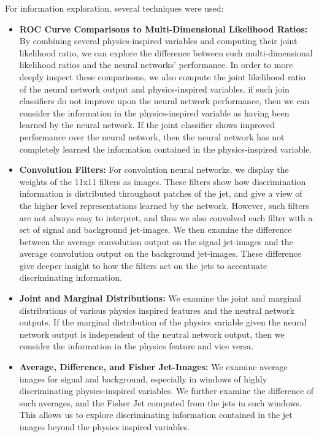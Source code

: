 For information exploration, several techniques were used:
\begin{itemize}

\item \textbf{ROC Curve Comparisons to Multi-Dimensional Likelihood Ratios:}  By combining several physics-inspired variables and computing their joint likelihood ratio, we can explore the difference between such multi-dimensional likelihood ratios and the neural networks' performance.  In order to more deeply inspect these comparisons, we also compute the joint likelihood ratio of the neural network output and physics-inspired variables.  if such join classifiers do not improve upon the neural network performance, then we can consider the information in the physics-inspired variable as having been learned by the neural network.  If the joint classifier shows improved performance over the neural network, then the neural network has not completely learned the information contained in the physics-inspired variable.

\item \textbf{Convolution Filters:}  For convolution neural networks, we display the weights of the 11x11 filters as images.  These filters show how discrimination information is distributed throughout patches of the jet, and give a view of the higher level representations learned by the network.  However, such filters are not always easy to interpret, and thus we also convolved each filter with a set of signal and background jet-images.  We then examine the difference between the average convolution output on the signal jet-images and the average convolution output on the background jet-images.  These difference give deeper insight to how the filters act on the jets to accentuate discriminating information.

\item \textbf{Joint and Marginal Distributions:}  We examine the joint and marginal distributions of various physics inspired features and the neutral network outputs.  If the marginal distribution of the physics variable given the neural network output is independent of the neutral network output, then we consider the information in the physics feature and vice versa.

\item \textbf{Average, Difference, and Fisher Jet-Images:}  We examine average images for signal and background, especially in windows of highly discriminating physics-inspired variables.  We further examine the difference of such averages, and the Fisher Jet computed from the jets in such windows.  This allows us to explore discriminating information contained in the jet images beyond the physics inspired variables.


\end{itemize}
